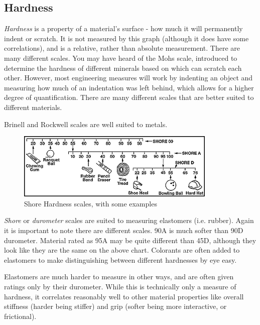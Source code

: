 \subsection{Hardness}
 \textit{Hardness} is a property of a material's surface - how much it will permanently indent or scratch. It is not measured by this graph (although it does have some correlations), and is a relative, rather than absolute measurement. There are many different scales. You may have heard of the Mohs scale, introduced to determine the hardness of different minerals based on which can scratch each other. However, most engineering measures will work by indenting an object and measuring how much of an indentation was left behind, which allows for a higher degree of quantification. There are many different scales that are better suited to different materials.
 
 Brinell and Rockwell scales are well suited to metals.
 
 \begin{figure}[H]
 	\includegraphics[width=0.85\textwidth]{imgs/shore_hardness.jpeg}
 	\caption{Shore Hardness scales, with some examples}
 \end{figure}
 
 \textit{Shore} or \textit{durometer} scales are suited to measuring elastomers (i.e. rubber). Again it is important to note there are different scales. 90A is much softer than 90D durometer. Material rated as 95A may be quite different than 45D, although they look like they are the same on the above chart. Colorants are often added to elastomers to make distinguishing between different hardnesses by eye easy.
 
 Elastomers are much harder to measure in other ways, and are often given ratings only by their durometer. While this is technically only a measure of hardness, it correlates reasonably well to other material properties like overall stiffness (harder being stiffer) and grip (softer being more interactive, or frictional).
 
